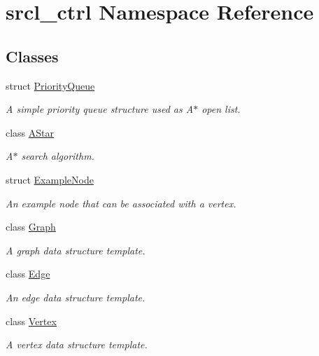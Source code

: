 \hypertarget{namespacesrcl__ctrl}{\section{srcl\-\_\-ctrl Namespace Reference}
\label{namespacesrcl__ctrl}
}
\subsection*{Classes}
\begin{DoxyCompactItemize}
\item 
struct \hyperlink{structsrcl__ctrl_1_1PriorityQueue}{Priority\-Queue}
\begin{DoxyCompactList}\small\item\em A simple priority queue structure used as A$\ast$ open list. \end{DoxyCompactList}\item 
class \hyperlink{classsrcl__ctrl_1_1AStar}{A\-Star}
\begin{DoxyCompactList}\small\item\em A$\ast$ search algorithm. \end{DoxyCompactList}\item 
struct \hyperlink{structsrcl__ctrl_1_1ExampleNode}{Example\-Node}
\begin{DoxyCompactList}\small\item\em An example node that can be associated with a vertex. \end{DoxyCompactList}\item 
class \hyperlink{classsrcl__ctrl_1_1Graph}{Graph}
\begin{DoxyCompactList}\small\item\em A graph data structure template. \end{DoxyCompactList}\item 
class \hyperlink{classsrcl__ctrl_1_1Edge}{Edge}
\begin{DoxyCompactList}\small\item\em An edge data structure template. \end{DoxyCompactList}\item 
class \hyperlink{classsrcl__ctrl_1_1Vertex}{Vertex}
\begin{DoxyCompactList}\small\item\em A vertex data structure template. \end{DoxyCompactList}\end{DoxyCompactItemize}
